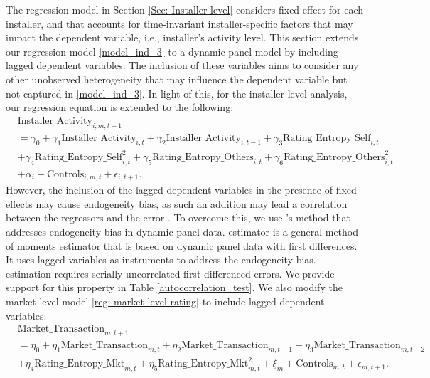 \documentclass[mnsc,blindrev]{informs3}
\begin{document}
	The regression model in Section \ref{Sec: Installer-level} considers fixed effect for each installer, and that accounts for time-invariant installer-specific factors that may impact the dependent variable, i.e., installer's activity level. This section extends our regression model  \eqref{model_ind_3} to a dynamic panel model by including lagged dependent variables. The inclusion of these variables aims to consider any other unobserved heterogeneity that may influence the dependent variable but not captured in  \eqref{model_ind_3}. In light of this, for the installer-level analysis, our regression equation is extended to the following:
	\begin{align} \nonumber
	&\text{Installer\_Activity}_{i,m,t+1} \\ \nonumber
	&=\gamma_{0}+\gamma_{1} \text{Installer\_Activity}_{i,t}+ \gamma_{2}\text{Installer\_Activity}_{i,t-1}+
	\gamma_{3} \text{Rating\_Entropy\_Self}_{i,t} \\ \nonumber
	&+ \gamma_{4} \text{Rating\_Entropy\_Self}_{i,t}^ {2} + \gamma_{5} \text{Rating\_Entropy\_Others}_{i,t}  + \gamma_{6} \text{Rating\_Entropy\_Others}_{i,t}^{2} \\ \label{eq: extended_ind}
	&+ \alpha_{i}+ \text{Controls}_{i,m,t}+ \epsilon_{i,t+1}.
	\end{align}
However,  the inclusion of the lagged dependent variables in the presence of fixed effects may cause endogeneity bias, as such an addition may lead a correlation between the regressors and the error \citep{nickell1981biases}. To overcome this, we use \cite{arellano1991some}'s method that addresses endogeneity bias in dynamic panel data. \cite{arellano1991some} estimator is a general method of moments estimator that is based on dynamic panel data with first differences. It uses lagged variables as instruments to address the endogeneity bias. \cite{arellano1991some} estimation requires serially uncorrelated first-differenced errors. We provide support for this property in Table \ref{autocorrelation_test}. We also modify the market-level model \eqref{reg: market-level-rating} to include lagged dependent variables:
	\begin{align} \nonumber
	&\text{Market\_Transaction}_{m,t+1}\\ \nonumber
	& =\eta_{0}+ \eta_{1} \text{Market\_Transaction}_{m,t}+ \eta_{2} \text{Market\_Transaction}_{m,t-1} + \eta_{3} \text{Market\_Transaction}_{m,t-2} \\ \label{eq: ext_market_level}
	&+ \eta_{4} \text{Rating\_Entropy\_Mkt}_{m,t}+ \eta_{5}\text{Rating\_Entropy\_Mkt}_{m,t} ^2 + \xi_{m}+ \text{Controls}_{m,t}  +\epsilon_{m,t+1}.
	\end{align}
\end{document}

